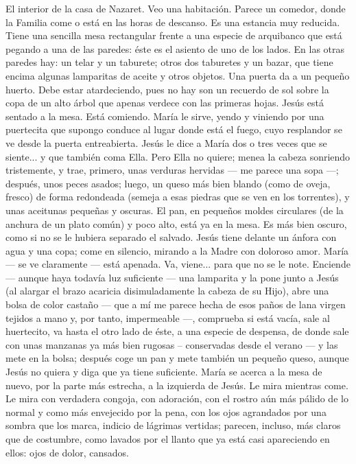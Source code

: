 \documentclass[12pt, twoside, openright]{book} %
\begin{document}
El interior de la casa de Nazaret. Veo una habitación. Parece un comedor, donde la Familia come o está en las horas de descanso. Es una estancia muy reducida. Tiene una sencilla mesa rectangular frente a una especie de arquibanco que está pegando a una de las paredes: éste es el asiento de uno de los lados. En las otras paredes hay: un telar y un taburete; otros dos taburetes y un bazar, que tiene encima algunas lamparitas de aceite y otros objetos. Una puerta da a un pequeño huerto. Debe estar atardeciendo, pues no hay son un recuerdo de sol sobre la copa de un alto árbol que apenas verdece con las primeras hojas.
Jesús está sentado a la mesa. Está comiendo. María le sirve, yendo y viniendo por una puertecita que supongo conduce al lugar donde está el fuego, cuyo resplandor se ve desde la puerta entreabierta.
Jesús le dice a María dos o tres veces que se siente... y que también coma Ella. Pero Ella no quiere; menea la cabeza sonriendo tristemente, y trae, primero, unas verduras hervidas — me parece una sopa —; después, unos peces asados; luego, un queso más bien blando (como de oveja, fresco) de forma redondeada (semeja a esas piedras que se ven en los torrentes), y unas aceitunas pequeñas y oscuras. El pan, en pequeños moldes circulares (de la anchura de un plato común) y poco alto, está ya en la mesa. Es más bien oscuro, como si no se le hubiera separado el salvado. Jesús tiene delante un ánfora con agua y una copa; come en silencio, mirando a la Madre con doloroso amor.
María — se ve claramente — está apenada. Va, viene... para que no se le note. Enciende — aunque haya todavía luz suficiente — una lamparita y la pone junto a Jesús (al alargar el brazo acaricia disimuladamente la cabeza de su Hijo), abre una bolsa de color castaño — que a mí me parece hecha de esos paños de lana virgen tejidos a mano y, por tanto, impermeable —, comprueba si está vacía, sale al huertecito, va hasta el otro lado de éste, a una especie de despensa, de donde sale con unas manzanas ya más bien rugosas – conservadas desde el verano — y las mete en la bolsa; después coge un pan y mete también un pequeño queso, aunque Jesús no quiera y diga que ya tiene suficiente.
María se acerca a la mesa de nuevo, por la parte más estrecha, a la izquierda de Jesús. Le mira mientras come. Le mira con verdadera congoja, con adoración, con el rostro aún más pálido de lo normal y como más envejecido por la pena, con los ojos agrandados por una sombra que los marca, indicio de lágrimas vertidas; parecen, incluso, más claros que de costumbre, como lavados por el llanto que ya está casi apareciendo en ellos: ojos de dolor, cansados.
\end{document}
